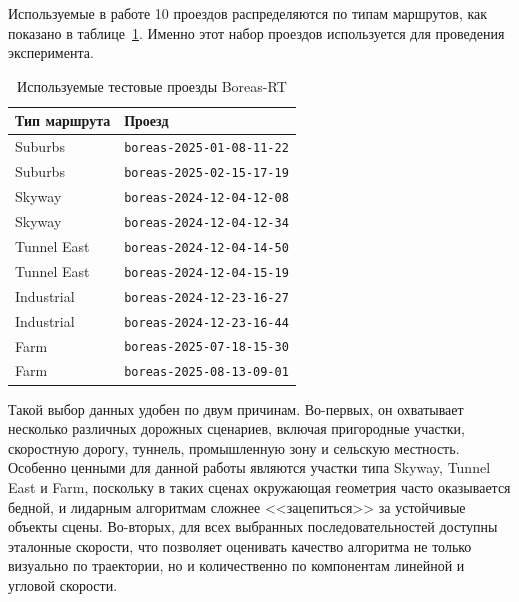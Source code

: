Используемые в работе 10 проездов распределяются по типам маршрутов, как показано в таблице~\ref{tab:boreas-rt-routes}. Именно этот набор проездов используется для проведения эксперимента.

\begin{table}
\centering
\caption{Используемые тестовые проезды Boreas-RT}
\label{tab:boreas-rt-routes}
\begin{tabular}{|l|l|}
\hline
Тип маршрута & Проезд \\
\hline
Suburbs & \texttt{boreas-2025-01-08-11-22} \\
\hline
Suburbs & \texttt{boreas-2025-02-15-17-19} \\
\hline
Skyway & \texttt{boreas-2024-12-04-12-08} \\
\hline
Skyway & \texttt{boreas-2024-12-04-12-34} \\
\hline
Tunnel East & \texttt{boreas-2024-12-04-14-50} \\
\hline
Tunnel East & \texttt{boreas-2024-12-04-15-19} \\
\hline
Industrial & \texttt{boreas-2024-12-23-16-27} \\
\hline
Industrial & \texttt{boreas-2024-12-23-16-44} \\
\hline
Farm & \texttt{boreas-2025-07-18-15-30} \\
\hline
Farm & \texttt{boreas-2025-08-13-09-01} \\
\hline
\end{tabular}
\end{table}

Такой выбор данных удобен по двум причинам. Во-первых, он охватывает несколько различных дорожных сценариев, включая пригородные участки, скоростную дорогу, туннель, промышленную зону и сельскую местность. Особенно ценными для данной работы являются участки типа Skyway, Tunnel East и Farm, поскольку в таких сценах окружающая геометрия часто оказывается бедной, и лидарным алгоритмам сложнее <<зацепиться>> за устойчивые объекты сцены. Во-вторых, для всех выбранных последовательностей доступны эталонные скорости, что позволяет оценивать качество алгоритма не только визуально по траектории, но и количественно по компонентам линейной и угловой скорости.
